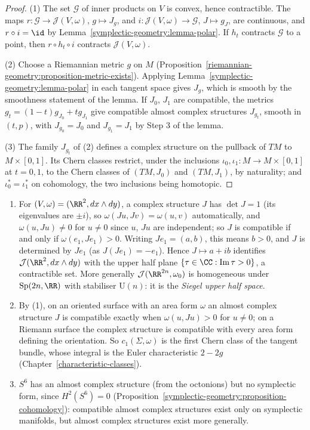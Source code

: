 \begin{proof}
(1) The set $\mathcal{G}$ of inner products on $V$ is convex, hence contractible. The maps $r \colon \mathcal{G} \to \mathcal{J}(V, \omega)$, $g \mapsto J_g$, and $i \colon \mathcal{J}(V, \omega) \to \mathcal{G}$, $J \mapsto g_J$, are
continuous, and $r \circ i = \id$ by Lemma~\ref{symplectic-geometry:lemma-polar}. If $h_t$ contracts $\mathcal{G}$ to a point, then $r \circ h_t \circ i$ contracts $\mathcal{J}(V, \omega)$.

(2) Choose a Riemannian metric $g$ on $M$ (Proposition~\ref{riemannian-geometry:proposition-metric-exists}). Applying Lemma~\ref{symplectic-geometry:lemma-polar} in each tangent space gives
$J_g$, which is smooth by the smoothness statement of the lemma. If $J_0$, $J_1$ are compatible, the metrics $g_t = (1 - t)g_{J_0} + tg_{J_1}$ give compatible almost complex structures $J_{g_t}$, smooth in $(t, p)$,
with $J_{g_0} = J_0$ and $J_{g_1} = J_1$ by Step 3 of the lemma.

(3) The family $J_{g_t}$ of (2) defines a complex structure on the pullback of $TM$ to $M \times [0, 1]$. Its Chern classes restrict, under the inclusions $\iota_0, \iota_1 \colon M \to M \times [0, 1]$ at $t = 0, 1$, to the Chern
classes of $(TM, J_0)$ and $(TM, J_1)$, by naturality; and $\iota_0^* = \iota_1^*$ on cohomology, the two inclusions being homotopic.
\end{proof}

\begin{example}\label{symplectic-geometry:example-compatible}
\begin{enumerate}
\item For $(V, \omega) = (\RR^2, dx \wedge dy)$, a complex structure $J$ has $\det J = 1$ (its eigenvalues are $\pm i$), so $\omega(Ju, Jv) = \omega(u, v)$ automatically, and $\omega(u, Ju) \neq 0$ for $u \neq 0$
since $u$, $Ju$ are independent; so $J$ is compatible if and only if $\omega(e_1, Je_1) > 0$. Writing $Je_1 = (a, b)$, this means $b > 0$, and $J$ is determined by $Je_1$ (as $J(Je_1) = -e_1$). Hence
$J \mapsto a + ib$ identifies $\mathcal{J}(\RR^2, dx \wedge dy)$ with the upper half plane $\{\tau \in \CC : \operatorname{Im}\tau > 0\}$, a contractible set. More generally $\mathcal{J}(\RR^{2n}, \omega_0)$ is
homogeneous under $\mathrm{Sp}(2n, \RR)$ with stabiliser $\mathrm{U}(n)$: it is the \emph{Siegel upper half space}.
\item By (1), on an oriented surface with an area form $\omega$ an almost complex structure $J$ is compatible exactly when $\omega(u, Ju) > 0$ for $u \neq 0$; on a Riemann surface the complex structure is compatible
with every area form defining the orientation. So $c_1(\Sigma, \omega)$ is the first Chern class of the tangent bundle, whose integral is the Euler characteristic $2 - 2g$ (Chapter~\ref{characteristic-classes}).
\item $S^6$ has an almost complex structure (from the octonions) but no symplectic form, since $H^2(S^6) = 0$ (Proposition~\ref{symplectic-geometry:proposition-cohomology}): compatible almost complex structures exist
only on symplectic manifolds, but almost complex structures exist more generally.
\end{enumerate}
\end{example}

